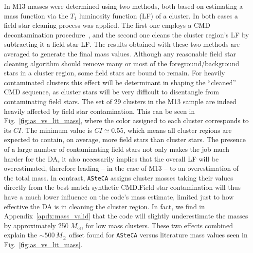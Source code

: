 \documentclass{aa}
\begin{document}
In M13 masses were determined using two methods, both based on estimating
a mass function via the $T_1$ luminosity function (LF) of a cluster.
In both cases a field star cleaning process was applied. The first one employs
a CMD decontamination procedure~\citep{Maia_2010}, and the
second one cleans the cluster region's LF by subtracting it a field star LF.\@
The results obtained with these two methods are averaged to generate the final
mass values.
%
Although any reasonable field star cleaning algorithm should remove many or most
of the foreground/background stars in a cluster region, some field stars are
bound to remain.
For heavily contaminated clusters this effect will be determinant in shaping the
``cleaned'' CMD sequence, as cluster stars will be very difficult to
disentangle from contaminating field stars.
%
The set of 29 clusters in the M13 sample are indeed heavily affected by field
star contamination. This can be seen in Fig.~\ref{fig:as_vs_lit_mass}, where the
color assigned to each cluster corresponds to its $CI$. The minimum value is
$CI{\simeq}0.55$, which means all cluster regions are expected to contain, on
average, more field stars than cluster stars.
%
The presence of a large number of contaminating field stars not only makes the
job much harder for the DA, it also necessarily implies that the overall LF will
be overestimated, therefore leading -- in the case of M13 --  to an
overestimation of the total mass.
In contrast, \texttt{ASteCA} assigns cluster masses taking their values directly
from the best match synthetic CMD.\@ Field star contamination will thus have
a much lower influence on the code's mass estimate, limited just to how
effective the DA is in cleaning the cluster region. In fact, we find in
Appendix~\ref{apdx:mass_valid} that the code will slightly underestimate the
masses by approximately 250 $M_{\odot}$, for low mass clusters.
These two effects combined explain the ${\sim}500\,M_{\odot}$ offset found
for \texttt{ASteCA} versus literature mass values seen in
Fig.~\ref{fig:as_vs_lit_mass}.
\end{document}
